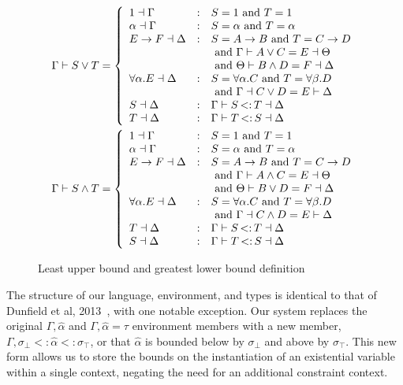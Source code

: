 \documentclass{sig-alternate}
\newcommand{\st}{\ensuremath{\hspace{-1px}<:\hspace{-1px}}}
\newcommand{\alphahat}{\hat{\alpha}}
\newcommand{\botbound}{\sigma_\bot}
\newcommand{\topbound}{\sigma_\top}
\newcommand{\lub}{\ensuremath{\vee}}
\newcommand{\glb}{\ensuremath{\wedge}}
\newcommand{\tst}{{\scriptstyle{<:}}}
\newcommand{\bound}[3]{#1 \tst #2 \tst #3}
\begin{document}
\begin{figure}
\begin{align*}
\Gamma \vdash S \lub T &= \left\{
\begin{array}{lcl}
1 \dashv \Gamma & : & S=1 \text{ and } T=1\\
\alpha \dashv \Gamma & : & S=\alpha \text{ and } T=\alpha\\
E\rightarrow F \dashv \Delta & : & S=A\rightarrow B  \text{ and } T=C \rightarrow D \\ && \text{ and } \Gamma \vdash A \lub C = E \dashv \Theta \\ && \text{ and } \Theta \vdash B \glb D = F \dashv \Delta\\
\forall \alpha.E \dashv \Delta & : & S=\forall\alpha.C \text{ and } T=\forall\beta.D \\ && \text{ and } \Gamma \dashv C \lub D = E \vdash \Delta\\
S \dashv \Delta & : & \Gamma \vdash S \st T \dashv \Delta\\
T \dashv \Delta & : & \Gamma \vdash T \st S \dashv \Delta\\
\end{array}
\right.\\
\Gamma \vdash  S \glb T &= \left\{
\begin{array}{lcl}
1 \dashv \Gamma & : & S=1 \text{ and } T=1\\
\alpha \dashv \Gamma & : & S=\alpha \text{ and } T=\alpha\\
E\rightarrow F \dashv \Delta & : & S=A\rightarrow B  \text{ and } T=C \rightarrow D \\ && \text{ and } \Gamma \vdash A \glb C = E \dashv \Theta \\ && \text{ and } \Theta \vdash B \lub D = F \dashv \Delta\\
\forall \alpha.E \dashv \Delta & : & S=\forall\alpha.C \text{ and } T=\forall\beta.D \\ && \text{ and } \Gamma \dashv C \glb D = E \vdash \Delta\\
T \dashv \Delta & : & \Gamma \vdash S \st T \dashv \Delta\\
S \dashv \Delta & : & \Gamma \vdash T \st S \dashv \Delta\\
\end{array}
\right.
\end{align*}
\caption{Least upper bound and greatest lower bound definition}
\label{fig:bounds}
\end{figure} 

The structure of our language, environment, and types is identical to that of Dunfield et al, 2013~\cite{Dunfield:2013:CEB:2544174.2500582}, with one notable exception. Our system replaces the original $\Gamma, \hat{\alpha}$ and $\Gamma, \hat{\alpha}=\tau$ environment members with a new member, $\Gamma, \bound{\botbound }{\hat{\alpha}}{\topbound}$, or that $\alphahat$ is bounded below by $\botbound$ and above by $\topbound$. This new form allows us to store the bounds on the instantiation of an existential variable within a single context, negating the need for an additional constraint context.
\end{document}
